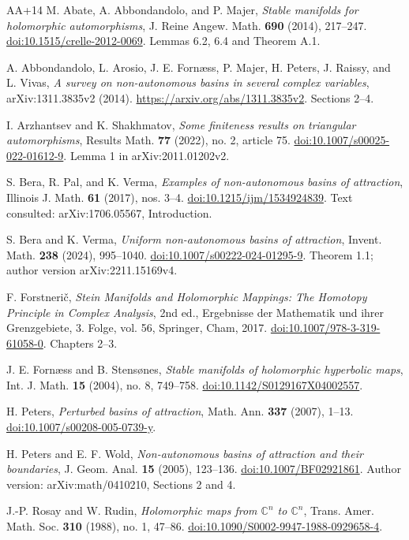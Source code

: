 \documentclass[12pt]{amsart}
\theoremstyle{definition}
\theoremstyle{remark}
\numberwithin{equation}{section}
\newcommand{\C}{\mathbb{C}}
\begin{document}
\begin{thebibliography}{AA+14}
M. Abate, A. Abbondandolo, and P. Majer, \emph{Stable manifolds for holomorphic automorphisms}, J. Reine Angew. Math. \textbf{690} (2014), 217--247. \href{https://doi.org/10.1515/crelle-2012-0069}{doi:10.1515/crelle-2012-0069}. Lemmas 6.2, 6.4 and Theorem A.1.

A. Abbondandolo, L. Arosio, J. E. Forn\ae ss, P. Majer, H. Peters, J. Raissy, and L. Vivas, \emph{A survey on non-autonomous basins in several complex variables}, arXiv:1311.3835v2 (2014). \url{https://arxiv.org/abs/1311.3835v2}. Sections 2--4.

I. Arzhantsev and K. Shakhmatov, \emph{Some finiteness results on triangular automorphisms}, Results Math. \textbf{77} (2022), no. 2, article 75. \href{https://doi.org/10.1007/s00025-022-01612-9}{doi:10.1007/s00025-022-01612-9}. Lemma 1 in arXiv:2011.01202v2.

S. Bera, R. Pal, and K. Verma, \emph{Examples of non-autonomous basins of attraction}, Illinois J. Math. \textbf{61} (2017), nos. 3--4. \href{https://doi.org/10.1215/ijm/1534924839}{doi:10.1215/ijm/1534924839}. Text consulted: arXiv:1706.05567, Introduction.

S. Bera and K. Verma, \emph{Uniform non-autonomous basins of attraction}, Invent. Math. \textbf{238} (2024), 995--1040. \href{https://doi.org/10.1007/s00222-024-01295-9}{doi:10.1007/s00222-024-01295-9}. Theorem 1.1; author version arXiv:2211.15169v4.

F. Forstneri\v c, \emph{Stein Manifolds and Holomorphic Mappings: The Homotopy Principle in Complex Analysis}, 2nd ed., Ergebnisse der Mathematik und ihrer Grenzgebiete, 3. Folge, vol. 56, Springer, Cham, 2017. \href{https://doi.org/10.1007/978-3-319-61058-0}{doi:10.1007/978-3-319-61058-0}. Chapters 2--3.

J. E. Forn\ae ss and B. Stens\o nes, \emph{Stable manifolds of holomorphic hyperbolic maps}, Int. J. Math. \textbf{15} (2004), no. 8, 749--758. \href{https://doi.org/10.1142/S0129167X04002557}{doi:10.1142/S0129167X04002557}.

H. Peters, \emph{Perturbed basins of attraction}, Math. Ann. \textbf{337} (2007), 1--13. \href{https://doi.org/10.1007/s00208-005-0739-y}{doi:10.1007/s00208-005-0739-y}.

H. Peters and E. F. Wold, \emph{Non-autonomous basins of attraction and their boundaries}, J. Geom. Anal. \textbf{15} (2005), 123--136. \href{https://doi.org/10.1007/BF02921861}{doi:10.1007/BF02921861}. Author version: arXiv:math/0410210, Sections 2 and 4.

J.-P. Rosay and W. Rudin, \emph{Holomorphic maps from $\C^n$ to $\C^n$}, Trans. Amer. Math. Soc. \textbf{310} (1988), no. 1, 47--86. \href{https://doi.org/10.1090/S0002-9947-1988-0929658-4}{doi:10.1090/S0002-9947-1988-0929658-4}.

\end{thebibliography}
\end{document}
